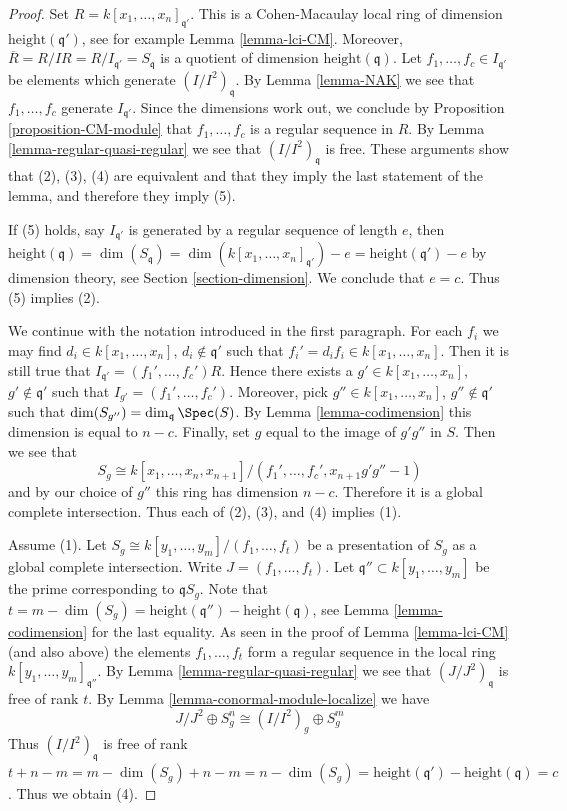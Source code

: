 \begin{proof}
Set $R = k[x_1, \ldots, x_n]_{\mathfrak q'}$. This is a
Cohen-Macaulay local
ring of dimension $\text{height}(\mathfrak q')$, see for example
Lemma \ref{lemma-lci-CM}. Moreover,
$\overline{R} = R/IR = R/I_{\mathfrak q'} = S_{\mathfrak q}$
is a quotient of dimension $\text{height}(\mathfrak q)$.
Let $f_1, \ldots, f_c \in I_{\mathfrak q'}$ be elements
which generate $(I/I^2)_{\mathfrak q}$. By Lemma \ref{lemma-NAK}
we see that $f_1, \ldots, f_c$ generate $I_{\mathfrak q'}$.
Since the dimensions work out, we conclude
by Proposition \ref{proposition-CM-module} that
$f_1, \ldots, f_c$ is a regular sequence in $R$.
By Lemma \ref{lemma-regular-quasi-regular} we see that
$(I/I^2)_{\mathfrak q}$ is free.
These arguments show that (2), (3), (4) are equivalent and
that they imply the last statement of the lemma, and therefore
they imply (5).

\medskip\noindent
If (5) holds, say $I_{\mathfrak q'}$ is generated by a regular
sequence of length $e$, then
$\text{height}(\mathfrak q) = \dim(S_{\mathfrak q}) =
\dim(k[x_1, \ldots, x_n]_{\mathfrak q'}) - e =
\text{height}(\mathfrak q') - e$ by dimension theory,
see Section \ref{section-dimension}. We conclude that $e = c$.
Thus (5) implies (2).

\medskip\noindent
We continue with the notation introduced in the first paragraph.
For each $f_i$ we may find $d_i \in k[x_1, \ldots, x_n]$,
$d_i \not \in \mathfrak q'$ such that
$f_i' = d_i f_i \in k[x_1, \ldots, x_n]$.
Then it is still true that $I_{\mathfrak q'} = (f_1', \ldots, f_c')R$.
Hence there exists a $g' \in k[x_1, \ldots, x_n]$, $g' \not \in \mathfrak q'$
such that $I_{g'} = (f_1', \ldots, f_c')$.
Moreover, pick $g'' \in k[x_1, \ldots, x_n]$, $g'' \not \in \mathfrak q'$
such that $\dim(S_{g''}) = \dim_{\mathfrak q} \Spec(S)$.
By Lemma \ref{lemma-codimension} this dimension is equal to $n - c$.
Finally, set $g$ equal to the image of $g'g''$ in $S$.
Then we see that
$$
S_g \cong k[x_1, \ldots, x_n, x_{n + 1}]
/
(f_1', \ldots, f_c', x_{n + 1}g'g'' - 1)
$$
and by our choice of $g''$ this ring has dimension $n - c$.
Therefore it is a global complete intersection.
Thus each of (2), (3), and (4) implies (1).

\medskip\noindent
Assume (1). Let $S_g \cong k[y_1, \ldots, y_m]/(f_1, \ldots, f_t)$
be a presentation of $S_g$ as a global complete intersection.
Write $J = (f_1, \ldots, f_t)$. Let $\mathfrak q'' \subset k[y_1, \ldots, y_m]$
be the prime corresponding to $\mathfrak qS_g$. Note that
$t = m - \dim(S_g) =
\text{height}(\mathfrak q'') - \text{height}(\mathfrak q)$,
see Lemma \ref{lemma-codimension} for the last equality.
As seen in the proof of Lemma \ref{lemma-lci-CM} (and also above) the elements
$f_1, \ldots, f_t$ form a regular sequence in the local ring
$k[y_1, \ldots, y_m]_{\mathfrak q''}$.
By Lemma \ref{lemma-regular-quasi-regular} we see that
$(J/J^2)_{\mathfrak q}$ is free of rank $t$.
By Lemma \ref{lemma-conormal-module-localize} we have
$$
J/J^2 \oplus S_g^n \cong (I/I^2)_g \oplus S_g^m
$$
Thus $(I/I^2)_{\mathfrak q}$ is free of rank
$t + n - m = m - \dim(S_g) + n - m = n - \dim(S_g) =
\text{height}(\mathfrak q') - \text{height}(\mathfrak q) = c$.
Thus we obtain (4).
\end{proof}


